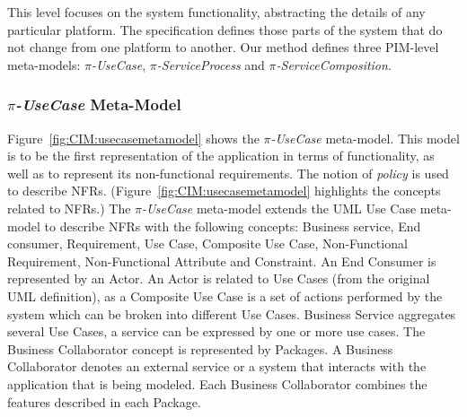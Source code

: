 \documentclass{singlecol-new}
\theoremstyle{TH}{
\newtheorem{lemma}{Lemma}
\newtheorem{theorem}[lemma]{Theorem}
\newtheorem{corrolary}[lemma]{Corrolary}
\newtheorem{conjecture}[lemma]{Conjecture}
\newtheorem{proposition}[lemma]{Proposition}
\newtheorem{claim}[lemma]{Claim}
\newtheorem{stheorem}[lemma]{Wrong Theorem}
\newtheorem{algorithm}{Algorithm}
}
\theoremstyle{THrm}{
\newtheorem{definition}{Definition}[section]
\newtheorem{question}{Question}[section]
\newtheorem{remark}{Remark}
\newtheorem{scheme}{Scheme}
}
\theoremstyle{THhit}{
\newtheorem{case}{Case}[section]
}
\theoremstyle{THhsl}{
\newtheorem{example}{Example}
}
\begin{document}
This level focuses on the system functionality, abstracting the details of any particular platform.
The specification defines those parts of the system that do not change from one platform to another.
Our method defines three PIM-level meta-models: \textit{$\pi$-UseCase}, \textit{$\pi$-Ser\-vice\-Pro\-cess} and \textit{$\pi$-ServiceComposition}.

\subsubsection{\textit{$\pi$-UseCase} Meta-Model}%

Figure~\ref{fig:CIM:usecasemetamodel} shows the \textit{$\pi$-UseCase} meta-model.
This model is  to be the first representation of the application in terms of functionality, as well as to represent its non-func\-tion\-al requirements.
The notion of \textit{policy} is used to describe NFRs.
(Figure~\ref{fig:CIM:usecasemetamodel} highlights the concepts related to NFRs.)
The \textit{$\pi$-UseCase} meta-model extends the UML Use Case meta-model to describe NFRs with  the following  concepts:  {\sc Business service}\footnotemark {}, {\sc End consumer}, {\sc Requirement}, {\sc Use Case}, {\sc Composite Use Case}, {\sc Non-\-Func\-tion\-al Requirement}, {\sc Non-Functional} {\sc At\-tri\-bute} and {\sc Constraint}.
An {\sc End Consumer} is represented by an {\sc Actor}.
An  {\sc Actor} is related to {\sc Use Cases} (from the original UML definition), as a {\sc  Composite Use Case} is a set of actions performed by the system which can be broken into different {\sc Use Cases}.
{\sc  Business Service} aggregates several {\sc Use Cases},  a service can be expressed by one or more use cases.
 The {\sc Business Collaborator} concept is represented  by {\sc Packages}.
A {\sc Business Collaborator} denotes an external service or a system that interacts with the application that is being modeled.
Each {\sc Business Collaborator} combines the features described in each  {\sc Package}.
\end{document}
